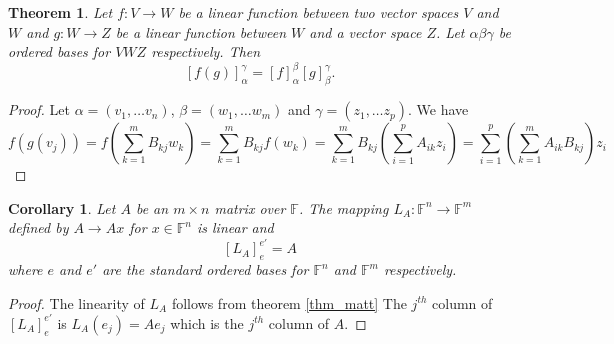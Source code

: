\documentclass[oneside, 12pt]{book}
\newtheorem{thm}{Theorem}[section]
\newtheorem{cor}{Corollary}[section]
\theoremstyle{definition}
\begin{document}
\begin{thm}
\label{thm_matprod}
  Let $f: V \to W$ be a linear function between two vector spaces $V$ and $W$ and $g: W \to Z$ be a linear function between $W$ and a vector space $Z$. Let $\alpha \beta \gamma$ be ordered bases for $V W Z$ respectively. Then
  \[[f(g)]_{\alpha}^{\gamma}=[f]_{\alpha}^{\beta}[g]_{\beta}^{\gamma}.\]
\end{thm}
\begin{proof}
  Let $\alpha=(v_{1}, \dots v_{n})$, $\beta=(w_{1}, \dots w_{m})$ and $\gamma=(z_{1}, \dots z_{p})$. We have \[f(g(v_{j}))=f(\sum_{k=1}^{m}B_{kj}w_{k})=\sum_{k=1}^{m}B_{kj}f(w_{k})=\sum_{k=1}^{m}B_{kj}(\sum_{i=1}^{p}A_{ik}z_{i})=\sum_{i=1}^{p}(\sum_{k=1}^{m}A_{ik}B_{kj})z_{i}\]
\end{proof}

\begin{cor}
\label{cor_leftmult}
  Let $A$ be an $m \times n$ matrix over $\mathbb{F}$.
The mapping $L_{A}: \mathbb{F}^{n}\to \mathbb{F}^{m}$ defined by $A \to Ax$ for $x \in \mathbb{F}^{n}$ is linear and \[[L_{A}]_{e}^{e'}=A\] where $e$ and $e'$ are the standard ordered bases for $\mathbb{F}^{n}$ and $\mathbb{F}^{m}$ respectively.
\end{cor}
\begin{proof}
  The linearity of $L_{A}$ follows from theorem \ref{thm_matt} The $j^{th}$ column of $[L_{A}]_{e}^{e'}$ is $L_{A}(e_{j})=Ae_{j}$ which is the $j^{th}$ column of $A$.
\end{proof}
\end{document}
